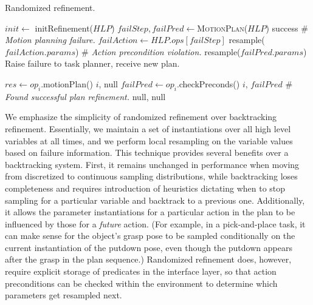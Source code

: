 \begin{algorithm}
 \caption{Randomized refinement.} \label{alg-randref}
 \begin{algorithmic}[1]
  \State $init \leftarrow$ initRefinement($HLP$)
  \State $failStep, failPred \leftarrow $\textsc{MotionPlan}($HLP$)
  \State \Return success
  \Else
  \State \# \emph{Motion planning failure.}
  \State $failAction \leftarrow HLP.ops[failStep]$
  \State resample($failAction.params$)
  \Else
  \State \# \emph{Action precondition violation.}
  \State resample($failPred.params$)
  \EndIf
  \EndIf
  \EndFor
  \State Raise failure to task planner, receive new plan.
  \EndProcedure

  \State $res \leftarrow op_{i}$.motionPlan()
  \State \Return $i$, null
  \Else
  \State $failPred \leftarrow op_{i}$.checkPreconds()
  \State \Return $i$, $failPred$
  \Else
  \State \# \emph{Found successful plan refinement.}
  \State \Return null, null
  \EndIf
  \EndIf
  \EndFor
  \EndProcedure
 \end{algorithmic}
\end{algorithm}

We emphasize the simplicity of randomized refinement over backtracking
refinement. Essentially, we maintain a set of instantiations over all high level
variables at all times, and we perform local resampling on the variable values based
on failure information. This technique provides several benefits over a backtracking
system. First, it remains unchanged in performance when moving from discretized to continuous
sampling distributions, while backtracking loses completeness and requires introduction
of heuristics dictating when to stop sampling for a particular variable and backtrack
to a previous one. Additionally, it allows the parameter instantiations for a particular action in
the plan to be influenced by those for a \emph{future} action. (For example, in a
pick-and-place task, it can make sense for the object's grasp pose to be sampled
conditionally on the current instantiation of the putdown pose, even though the putdown
appears after the grasp in the plan sequence.) Randomized refinement does, however,
require explicit storage of predicates in the interface layer, so that action preconditions
can be checked within the environment to determine which parameters get resampled next.